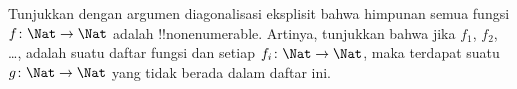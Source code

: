 \documentclass[../../../include/open-logic-section]{subfiles}
\begin{document}
\begin{prob}
Tunjukkan dengan argumen diagonalisasi eksplisit bahwa himpunan semua fungsi
$f \colon \Nat \to \Nat$ adalah !!{nonenumerable}. Artinya, tunjukkan bahwa
jika $f_1$, $f_2$, \dots, adalah suatu daftar fungsi dan setiap $f_i\colon
\Nat \to \Nat$, maka terdapat suatu $g \colon \Nat \to \Nat$ yang tidak
berada dalam daftar ini.
\end{prob}
\end{document}
